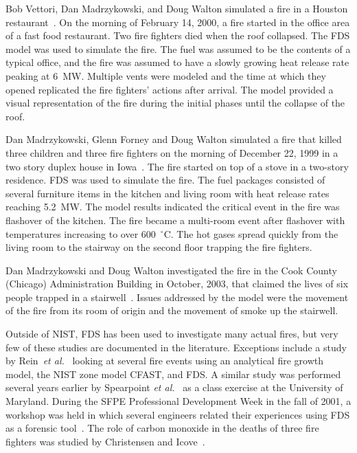 Bob Vettori, Dan Madrzykowski, and Doug Walton simulated a fire in a Houston restaurant~\cite{Texas}. On the morning of February 14, 2000, a fire started in the
office area of a fast food restaurant. Two fire fighters died when the roof collapsed. The FDS model was used to simulate the fire. The fuel was
assumed to be the contents of a typical office, and the fire was assumed to have a slowly growing heat release rate peaking at 6~MW. Multiple vents
were modeled and the time at which they opened replicated the fire fighters' actions after arrival.  The model provided a visual representation of
the fire during the initial phases until the collapse of the roof.

Dan Madrzykowski, Glenn Forney and Doug Walton simulated a fire that killed three children and three fire fighters on the morning of December 22, 1999 in a
two story duplex house in Iowa~\cite{Iowa}. The fire started on top of a stove in a two-story residence. FDS was used to simulate the fire.
The fuel packages consisted of several furniture items
in the kitchen and living room with heat release rates reaching 5.2~MW. The model results indicated the critical event in the fire was flashover of
the kitchen. The fire became a multi-room event after flashover with temperatures increasing to over 600~$^\circ$C. The hot gases spread quickly from
the living room to the stairway on the second floor trapping the fire fighters.

Dan Madrzykowski and Doug Walton investigated the fire in the Cook County (Chicago) Administration Building in October, 2003, that claimed the lives of six people trapped
in a stairwell~\cite{Cook_County}. Issues addressed by the model were the movement of the fire from its room of origin and the movement of smoke up the stairwell.

Outside of NIST, FDS has been used to investigate many actual fires, but very few of these studies are documented in the literature. Exceptions
include a study by Rein~{\em et al.}~\cite{Rein:Interflam2004} looking at several fire events using an analytical fire growth model, the NIST zone
model CFAST, and FDS. A similar study was performed several years earlier by Spearpoint {\em et al.}~\cite{Spearpoint:ICFRE3} as a class exercise at
the University of Maryland. During the SFPE Professional Development Week in the fall of 2001, a workshop was held in which several engineers related
their experiences using FDS as a forensic tool~\cite{Carpenter:SFPE2001}. The role of carbon monoxide in the deaths of three fire fighters was
studied by Christensen and Icove~\cite{Christensen:JFS}.
